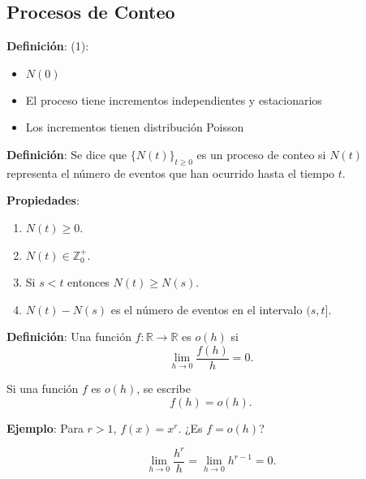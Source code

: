 \documentclass[12pt,a4paper]{article}
\newcommand{\definicion}[1]{%
\begin{definicionbox}
\textbf{Definición}: #1
\end{definicionbox}
}
\begin{document}
\subsection{Procesos de Conteo}

\definicion{(1):
\begin{itemize}
    \item $N(0)$
    \item El proceso tiene incrementos independientes y estacionarios
    \item Los incrementos tienen distribución Poisson
\end{itemize}}

\definicion{Se dice que $\{N(t)\}_{t \geq 0}$ es un proceso de conteo si $N(t)$ representa el número de eventos que han ocurrido hasta el tiempo $t$.}

\textbf{Propiedades}:

\begin{enumerate}
    \item $N(t) \geq 0$.
    \item $N(t) \in \mathbb{Z}_{0}^{+}$.
    \item Si $s < t$ entonces $N(t) \geq N(s)$.
    \item $N(t) - N(s)$ es el número de eventos en el intervalo $(s,t]$.
\end{enumerate}

\definicion{Una función $f : \mathbb{R} \to \mathbb{R}$ es $o(h)$ si 
\begin{equation*}
\lim_{h \to 0} \frac{f(h)}{h} = 0.
\end{equation*}}

Si una función $f$ es $o(h)$, se escribe
\begin{equation*}
f(h) = o(h).
\end{equation*}

\textbf{Ejemplo}: Para $r > 1$, $f(x) = x^r$.  
¿Es $f = o(h)$?

\begin{equation*}
\lim_{h \to 0} \frac{h^r}{h} = \lim_{h \to 0} h^{r-1} = 0.
\end{equation*}

\begin{center}
\end{center}
\end{document}
